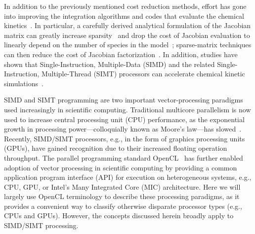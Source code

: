 \documentclass[12pt,number,sort&compress,preprint]{elsarticle}
\newcommand{\revise}[1]{{\sloppy\textcolor{RoyalPurple}{#1}}}  %
\begin{document}
In addition to the previously mentioned cost reduction methods, effort has gone into improving the integration algorithms and codes that evaluate the chemical kinetics~\cite{Gou:2010,SCHWER2002270,Niemeyer:2016aa,GAO2015287}.
In particular, a carefully derived analytical formulation of the Jacobian \revise{matrix can greatly increase sparsity}~\cite{SCHWER2002270} and drop the cost of Jacobian evaluation to \revise{linearly depend} on the number of species in the model~\cite{LU2009192}; \revise{sparse-matrix techniques can then reduce the cost of Jacobian factorization}~\cite{superlu99}.
\revise{In addition, studies have shown that} Single-Instruction, Multiple-Data (SIMD) and the related Single-Instruction, Multiple-Thread (SIMT) processors can accelerate chemical kinetic simulations~\cite{Shi:2012aa,Niemeyer:2014aa,Sewerin20151375,Niemeyer:2016aa,CurtisGPU:2017,stone2018}.

SIMD and SIMT programming are two important vector-processing paradigms used increasingly in scientific computing.
\revise{Traditional multicore parallelism is now used to increase} central processing unit (CPU) performance, \revise{as the exponential growth in processing power}---colloquially known as Moore's law---has slowed~\cite{khan2018science}.
\revise{Recently, SIMD\slash SIMT processors, e.g., in the form of graphics processing units (GPUs), have gained recognition due to their increased floating operation throughput}.
The parallel programming standard OpenCL~\cite{stone2010opencl} has further enabled adoption of vector processing in scientific computing by providing a common application program interface (API) for execution on heterogeneous systems, e.g., CPU, GPU, or Intel's Many Integrated Core (MIC) architecture.
\revise{Here we will} largely use OpenCL terminology to describe these processing paradigms, as it provides a convenient way to classify otherwise disparate processor types (e.g., CPUs and GPUs).
However, the concepts discussed herein \revise{broadly apply} to SIMD\slash SIMT processing.
\end{document}

